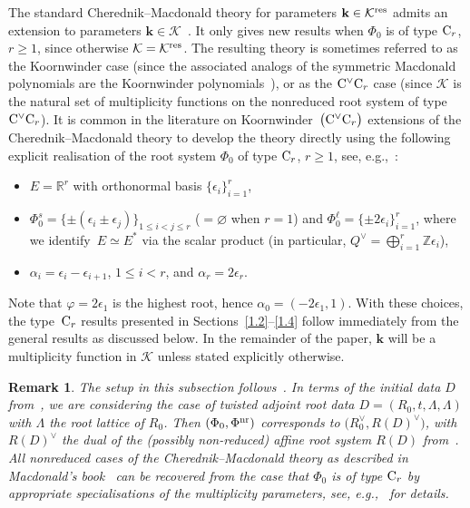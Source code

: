 \documentclass[11pt]{article}
\numberwithin{equation}{section}
\numberwithin{equation}{section}
\newtheorem{Remark}[Theorem]{Remark} }
\begin{document}
The standard Cherednik--Macdonald theory for parameters $\mathbf{k}\in\mathcal{K}^{{\rm res}}$ admits an extension to
parameters $\mathbf{k}\in\mathcal{K}$~\cite{No,Sa}. It only gives new results when $\Phi_0$ is of type ${\rm C}_r$, $r\geq 1$, since otherwise $\mathcal{K}=\mathcal{K}^{{\rm res}}$.
The resulting theory is sometimes referred to as the Koornwinder case \big(since the associated analogs of the symmetric Macdonald polynomials are the Koornwinder polynomials~\cite{Ko}\big), or as the ${\rm C}^\vee{\rm C}_r$ case (since $\mathcal{K}$ is the natural set of multiplicity functions on the nonreduced root system of type
${\rm C}^\vee{\rm C}_r$).
It is common in the literature on Koornwinder~$\big({\rm C}^\vee{\rm C}_r\big)$ extensions of the Cherednik--Macdonald theory
to develop the theory directly using the following explicit realisation of the root system $\Phi_0$ of type ${\rm C}_r$, $r\geq 1$, see, e.g.,~\cite{Ko,No,Sa,St}:
\begin{itemize}\itemsep=0pt
\item $E=\mathbb{R}^r$ with orthonormal basis $\{\epsilon_i\}_{i=1}^r$,
\item $\Phi_0^s=\{\pm(\epsilon_i\pm\epsilon_j)\}_{1\leq i<j\leq r}$ ($=\varnothing$ when $r=1$) and $\Phi_0^\ell=\{\pm 2\epsilon_i\}_{i=1}^r$, where we identify~${E\simeq E^*}$
via the scalar product \big(in particular, $Q^\vee=\bigoplus_{i=1}^r\mathbb{Z}\epsilon_i$\big),
\item $\alpha_i=\epsilon_i-\epsilon_{i+1}$, $1\leq i<r$, and $\alpha_r=2\epsilon_r$.
\end{itemize}
Note that
$\varphi=2\epsilon_1$ is the highest root, hence $\alpha_0=(-2\epsilon_1,1)$. With these choices, the type~${\rm C}_r$ results presented in Sections~\ref{1.2}--\ref{1.4} follow immediately from the general results as discussed below. In the remainder of the paper, $\mathbf{k}$ will be a multiplicity function in $\mathcal{K}$ unless stated explicitly otherwise.

\begin{Remark}
The setup in this subsection follows~\cite{StAM, StCh}. In terms of the initial data $D$ from~\cite[Section~1.1]{StAM}, we are considering the case of twisted adjoint root data $D=(R_0,t,\Lambda,\Lambda)$ with $\Lambda$ the root lattice of $R_0$. Then
$(\Phi_0,\Phi^{\textup{nr}})$ corresponds to $\bigl(R_0^\vee,R(D)^\vee\bigr)$, with $R(D)^\vee$ the dual of the (possibly non-reduced) affine root system $R(D)$ from~\cite[Section~1.1]{StAM}. All nonreduced cases of the Cherednik--Macdonald theory as described in Macdonald's book~\cite{Ma} can be recovered from the case that $\Phi_0$ is of type ${\rm C}_r$ by appropriate specialisations of the multiplicity parameters, see, e.g.,~\cite[Section~9.2.3]{StCh} for details.
\end{Remark}
\end{document}

